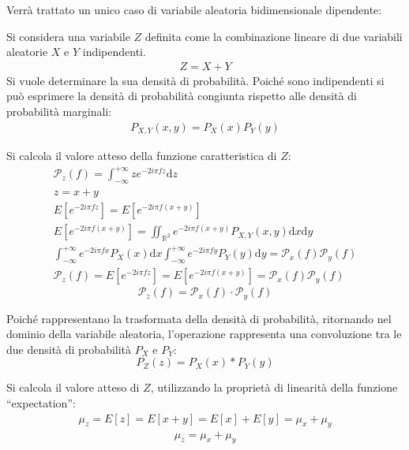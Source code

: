 \documentclass{article}
\newcommand{\df}{\mathrm{d}}
\numberwithin{equation}{subsection}
\begin{document}
Verrà trattato un unico caso di variabile aleatoria bidimensionale dipendente:

Si considera una variabile $Z$ definita come la combinazione lineare di due variabili aleatorie $X$ e $Y$ indipendenti. 
\begin{gather*}
    Z=X+Y
\end{gather*}
Si vuole determinare la sua densità di probabilità. 
Poiché sono indipendenti si può esprimere la densità di probabilità congiunta rispetto alle densità di probabilità marginali:
\begin{gather*}
    P_{X,Y}(x,y)=P_X(x)P_Y(y)
\end{gather*}

Si calcola il valore atteso della funzione caratteristica di $Z$:
\begin{gather*}
    \mathscr{P}_z(f)=\displaystyle\int_{-\infty}^{+\infty}ze^{-2i\pi fz}\df z\\
    z=x+y\\
    E[e^{-2i\pi fz}]=E[e^{-2i\pi f(x+y)}]\\
    E[e^{-2i\pi f(x+y)}]\displaystyle=\iint_{\mathbb{R}^2}e^{-2i\pi f(x+y)}P_{X,Y}(x,y)\df x\df y\\
    \displaystyle\int_{-\infty}^{+\infty}e^{-2i\pi fx}P_X(x)\df x\int_{-\infty}^{+\infty}e^{-2i\pi fy}P_Y(y)\df y=\mathscr{P}_x(f)\mathscr{P}_y(f)\\
    \mathscr{P}_z(f)=E[e^{-2i\pi fz}]=E[e^{-2i\pi f(x+y)}]=\mathscr{P}_x(f)\mathscr{P}_y(f)
\end{gather*}
\begin{equation}
    \mathscr{P}_z(f)=\mathscr{P}_x(f)\cdot\mathscr{P}_y(f)
\end{equation}

Poiché rappresentano la trasformata della densità di probabilità, ritornando nel dominio della variabile aleatoria, l'operazione rappresenta una convoluzione 
tra le due densità di probabilità $P_X$ e $P_Y$:
\begin{equation}
    P_Z(z)=P_X(x)*P_Y(y)
\end{equation}


Si calcola il valore atteso di $Z$, utilizzando la proprietà di linearità della funzione ``expectation'':
\begin{gather*}
    \mu_z=E[z]=E[x+y]=E[x]+E[y]=\mu_x+\mu_y
\end{gather*}
\begin{equation}
    \mu_z=\mu_x+\mu_y
\end{equation}
\end{document}
